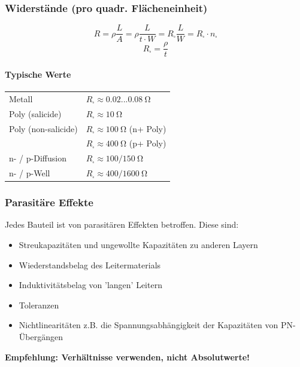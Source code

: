 \subsubsection{Widerstände (pro quadr. Flächeneinheit)}

\begin{minipage}[c]{0.48\columnwidth}
    $$ \boxed{ R = \rho \frac{L}{A} = \rho \frac{L}{t \cdot W} = R_\square \frac{L}{W} = R_\square \cdot n_\square } $$
    $$ \boxed{ R_\square = \frac{\rho}{t} } $$
\end{minipage}
\hfill
\begin{minipage}[c]{0.5\columnwidth}
    \paragraph{Typische Werte}

    \begin{tabular}{@{}l l@{}}
        Metall              & $R_\square \approx 0.02 ... \qty{0.08}{\ohm}$                  \\
        Poly (salicide)     & $R_\square \approx \qty{10}{\ohm}$                             \\
        Poly (non-salicide) & $R_\square \approx \qty{100}{\ohm}$ (n+ Poly)                  \\
                            & $R_\square \approx \qty{400}{\ohm}$ (p+ Poly)                  \\
        n- / p-Diffusion    & $R_\square \approx 100/\qty{150}{\ohm}$                        \\
        n- / p-Well         & $R_\square \approx 400/\qty{1600}{\ohm}$                       \\
    \end{tabular}
\end{minipage}




\subsubsection{Parasitäre Effekte}

Jedes Bauteil ist von parasitären Effekten betroffen. 
Diese sind:
\begin{itemize}
    \item Streukapazitäten und ungewollte Kapazitäten zu anderen Layern
    \item Wiederstandsbelag des Leitermaterials
    \item Induktivitätsbelag von 'langen' Leitern
    \item Toleranzen
    \item Nichtlinearitäten z.B. die Spannungsabhängigkeit der Kapazitäten von PN-Übergängen
\end{itemize}

\smallskip

\textbf{\rightarrow Empfehlung: Verhältnisse verwenden, nicht Absolutwerte!}

